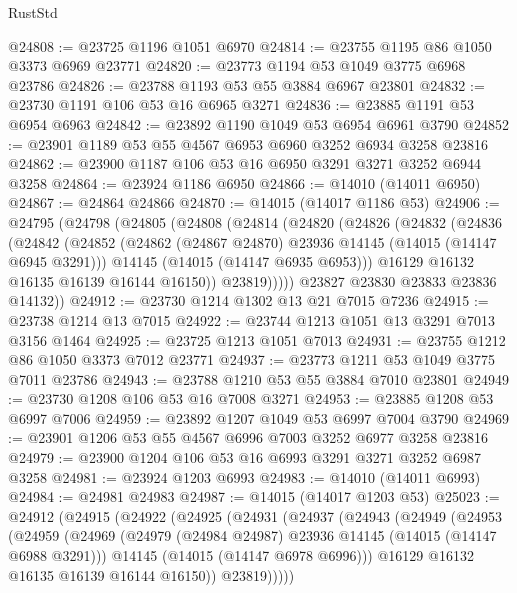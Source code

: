 \begin{lexlean}{RustStd}
\begin{coremodule}
@24808 := @23725 @1196 @1051 @6970
@24814 := @23755 @1195 @86 @1050 @3373 @6969 @23771
@24820 := @23773 @1194 @53 @1049 @3775 @6968 @23786
@24826 := @23788 @1193 @53 @55 @3884 @6967 @23801
@24832 := @23730 @1191 @106 @53 @16 @6965 @3271
@24836 := @23885 @1191 @53 @6954 @6963
@24842 := @23892 @1190 @1049 @53 @6954 @6961 @3790
@24852 := @23901 @1189 @53 @55 @4567 @6953 @6960 @3252 @6934 @3258 @23816
@24862 := @23900 @1187 @106 @53 @16 @6950 @3291 @3271 @3252 @6944 @3258
@24864 := @23924 @1186 @6950
@24866 := @14010 (@14011 @6950)
@24867 := @24864 @24866
@24870 := @14015 (@14017 @1186 @53)
@24906 := @24795
    (@24798
      (@24805
        (@24808
          (@24814
            (@24820
              (@24826
                (@24832
                  (@24836
                    (@24842
                      (@24852
                        (@24862 (@24867 @24870) @23936 @14145 (@14015 (@14147 @6945 @3291)))
                        @14145
                        (@14015 (@14147 @6935 @6953)))
                      @16129
                      @16132
                      @16135
                      @16139
                      @16144
                      @16150))
                  @23819)))))
        @23827
        @23830
        @23833
        @23836
        @14132))
@24912 := @23730 @1214 @1302 @13 @21 @7015 @7236
@24915 := @23738 @1214 @13 @7015
@24922 := @23744 @1213 @1051 @13 @3291 @7013 @3156 @1464
@24925 := @23725 @1213 @1051 @7013
@24931 := @23755 @1212 @86 @1050 @3373 @7012 @23771
@24937 := @23773 @1211 @53 @1049 @3775 @7011 @23786
@24943 := @23788 @1210 @53 @55 @3884 @7010 @23801
@24949 := @23730 @1208 @106 @53 @16 @7008 @3271
@24953 := @23885 @1208 @53 @6997 @7006
@24959 := @23892 @1207 @1049 @53 @6997 @7004 @3790
@24969 := @23901 @1206 @53 @55 @4567 @6996 @7003 @3252 @6977 @3258 @23816
@24979 := @23900 @1204 @106 @53 @16 @6993 @3291 @3271 @3252 @6987 @3258
@24981 := @23924 @1203 @6993
@24983 := @14010 (@14011 @6993)
@24984 := @24981 @24983
@24987 := @14015 (@14017 @1203 @53)
@25023 := @24912
    (@24915
      (@24922
        (@24925
          (@24931
            (@24937
              (@24943
                (@24949
                  (@24953
                    (@24959
                      (@24969
                        (@24979 (@24984 @24987) @23936 @14145 (@14015 (@14147 @6988 @3291)))
                        @14145
                        (@14015 (@14147 @6978 @6996)))
                      @16129
                      @16132
                      @16135
                      @16139
                      @16144
                      @16150))
                  @23819)))))

\end{coremodule}
\end{lexlean}
